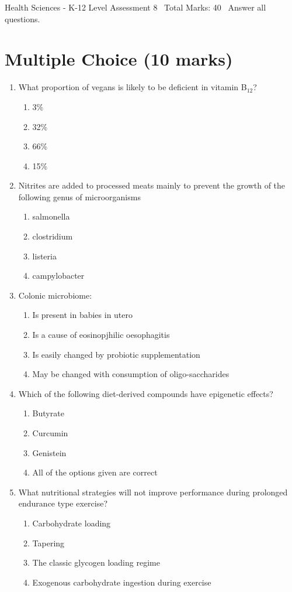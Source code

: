 \documentclass[12pt]{article}
\begin{document}
\begin{center}
Health Sciences - K-12 Level Assessment 8 \
Total Marks: 40 \
Answer all questions.
\end{center}

\section*{Multiple Choice (10 marks)}
\begin{enumerate}[label=\arabic*.]
\item What proportion of vegans is likely to be deficient in vitamin B$_{12}$?
\begin{enumerate}[label=(\alph*)]
    \item 3\%
    \item 32\%
    \item 66\%
    \item 15\%
\end{enumerate}
\item Nitrites are added to processed meats mainly to prevent the growth of the following genus of microorganisms
\begin{enumerate}[label=(\alph*)]
    \item salmonella
    \item clostridium
    \item listeria
    \item campylobacter
\end{enumerate}
\item Colonic microbiome:
\begin{enumerate}[label=(\alph*)]
    \item Is present in babies in utero
    \item Is a cause of eosinopjhilic oesophagitis
    \item Is easily changed by probiotic supplementation
    \item May be changed with consumption of oligo-saccharides
\end{enumerate}
\item Which of the following diet-derived compounds have epigenetic effects?
\begin{enumerate}[label=(\alph*)]
    \item Butyrate
    \item Curcumin
    \item Genistein
    \item All of the options given are correct
\end{enumerate}
\item What nutritional strategies will not improve performance during prolonged endurance type exercise?
\begin{enumerate}[label=(\alph*)]
    \item Carbohydrate loading
    \item Tapering
    \item The classic glycogen loading regime
    \item Exogenous carbohydrate ingestion during exercise
\end{enumerate}
\end{enumerate}
\end{document}
